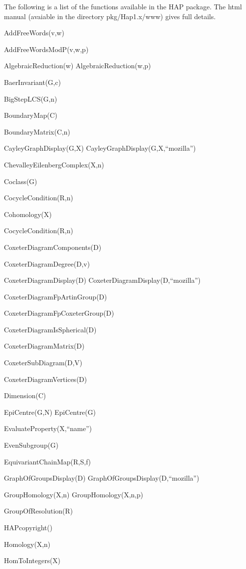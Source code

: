 
The following is a list of the functions available in the {\sf HAP} package. The html manual (avaiable in the directory pkg/Hap1.x/www) gives full details.

\bigskip
\bigskip

\>AddFreeWords(v,w)

\>AddFreeWordsModP(v,w,p)

\>AlgebraicReduction(w)
\>AlgebraicReduction(w,p)

\>BaerInvariant(G,c)

\>BigStepLCS(G,n)

\>BoundaryMap(C)

\>BoundaryMatrix(C,n)

\>CayleyGraphDisplay(G,X)
\>CayleyGraphDisplay(G,X,``mozilla'')

\>ChevalleyEilenbergComplex(X,n)

\>Coclass(G)

\>CocycleCondition(R,n)

\>Cohomology(X)

\>CocycleCondition(R,n)

\>CoxeterDiagramComponents(D)

\>CoxeterDiagramDegree(D,v)

\>CoxeterDiagramDisplay(D)
\>CoxeterDiagramDisplay(D,``mozilla'')

\>CoxeterDiagramFpArtinGroup(D)

\>CoxeterDiagramFpCoxeterGroup(D)

\>CoxeterDiagramIsSpherical(D)

\>CoxeterDiagramMatrix(D)

\>CoxeterSubDiagram(D,V)

\>CoxeterDiagramVertices(D)

\>Dimension(C)

\>EpiCentre(G,N)
\>EpiCentre(G)

\>EvaluateProperty(X,``name'')

\>EvenSubgroup(G)

\>EquivariantChainMap(R,S,f)

\>GraphOfGroupsDisplay(D)
\>GraphOfGroupsDisplay(D,``mozilla'')

\>GroupHomology(X,n)
\>GroupHomology(X,n,p)

\>GroupOfResolution(R)

\>HAPcopyright()

\>Homology(X,n)

\>HomToIntegers(X)


